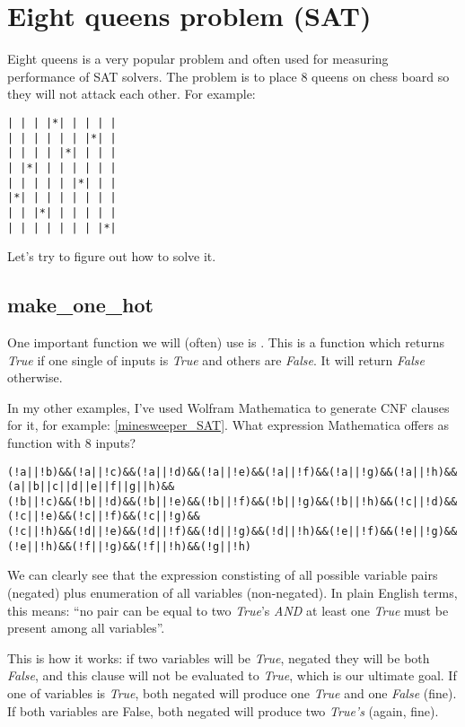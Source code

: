 \section{Eight queens problem (SAT)}
\label{EightQueens}

\renewcommand{\CURPATH}{puzzles/8queens}

Eight queens is a very popular problem and often used for measuring performance of SAT solvers.
The problem is to place 8 queens on chess board so they will not attack each other.
For example:

\begin{lstlisting}
| | | |*| | | | |
| | | | | | |*| |
| | | | |*| | | |
| |*| | | | | | |
| | | | | |*| | |
|*| | | | | | | |
| | |*| | | | | |
| | | | | | | |*|
\end{lstlisting}

Let's try to figure out how to solve it.

\subsection{make\_one\_hot}
\label{POPCNTOne}

One important function we will (often) use is .
This is a function which returns \emph{True} if one single of inputs is \emph{True} and others are \emph{False}.
It will return \emph{False} otherwise.

In my other examples, I've used Wolfram Mathematica to generate CNF clauses for it, for example: \ref{minesweeper_SAT}.
What expression Mathematica offers as  function with 8 inputs?

\begin{lstlisting}
(!a||!b)&&(!a||!c)&&(!a||!d)&&(!a||!e)&&(!a||!f)&&(!a||!g)&&(!a||!h)&&(a||b||c||d||e||f||g||h)&&
(!b||!c)&&(!b||!d)&&(!b||!e)&&(!b||!f)&&(!b||!g)&&(!b||!h)&&(!c||!d)&&(!c||!e)&&(!c||!f)&&(!c||!g)&&
(!c||!h)&&(!d||!e)&&(!d||!f)&&(!d||!g)&&(!d||!h)&&(!e||!f)&&(!e||!g)&&(!e||!h)&&(!f||!g)&&(!f||!h)&&(!g||!h)
\end{lstlisting}

We can clearly see that the expression constisting of all possible variable pairs (negated) plus
enumeration of all variables (non-negated).
In plain English terms, this means: ``no pair can be equal to two \emph{True}'s \emph{AND} at least one \emph{True}
must be present among all variables''.

This is how it works: if two variables will be \emph{True}, negated they will be both \emph{False},
and this clause will not be evaluated
to \emph{True}, which is our ultimate goal.
If one of variables is \emph{True}, both negated will produce one \emph{True} and one \emph{False} (fine).
If both variables are False, both negated will produce two \emph{True's} (again, fine).

